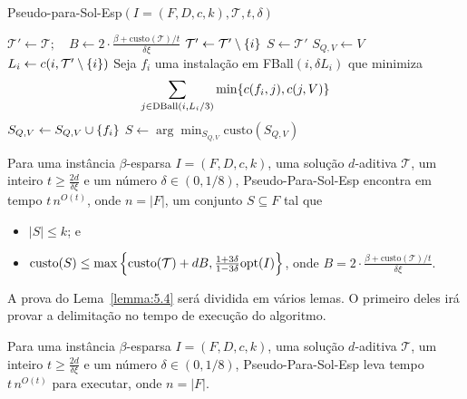 \begin{algorithm}
    \caption{\sc Pseudo-para-Sol-Esp$(I = (F,D,c,k), \mathcal{T}, t, \delta)$}
    \begin{algorithmic}[1]
        \State $\mathcal{T}' \gets \mathcal{T}; \quad B \gets 2 \cdot \frac{\beta + \text{custo}(\mathcal{T})/t}{\delta\xi}$
        \State $\mathcal{T}' \gets \mathcal{T}' \setminus \{i\}$
        \EndWhile
        \State \Return $S \gets \mathcal{T}'$
        \EndIf
            \State $S_{Q,V} \gets V$
                \State $L_i \gets c(i,\mathcal{T}' \setminus \{i\})$
                \State Seja $f_i$ uma instalação em FBall$(i, \delta L_i)$ que minimiza \[\sum_{j \in \text{DBall}(i,L_i/3)} \min\{c(f_i,j),c(j,V)\}\]
                \State $S_{Q,V} \gets S_{Q,V} \cup \{f_i\}$
            \EndFor
        \EndFor
        \State \Return $S \gets \arg\min_{S_{Q,V}} \text{custo}(S_{Q,V})$
    \end{algorithmic}
\end{algorithm}

\begin{lemma} \label{lemma:5.4}
    Para uma instância $\beta$-esparsa $I = (F,D,c,k)$, uma solução $d$-aditiva $\mathcal{T}$, um inteiro $t \geq \frac{2d}{\delta \xi}$ e um número $\delta \in (0,1/8)$, {\sc Pseudo-Para-Sol-Esp} encontra em tempo $t\, n^{O(t)}$, onde $n = |F|$, um conjunto $S \subseteq F$ tal que 
    \begin{itemize}
        \item $|S| \leq k$; e
        \item $\mathrm{custo}(S) \leq \max \left\{ \mathrm{custo}(\mathcal{T}) + dB, \frac{1+3\delta}{1-3\delta} \mathrm{opt}(I)\right\}$, onde $B = 2 \cdot \frac{\beta + \mathrm{custo}(\mathcal{T})/t}{\delta\xi}$.
    \end{itemize}
\end{lemma}

A prova do Lema~\ref{lemma:5.4} será dividida em vários lemas. O primeiro deles irá provar a delimitação no tempo de execução do algoritmo.

\begin{lemma}
    Para uma instância $\beta$-esparsa $I = (F,D,c,k)$, uma solução $d$-aditiva $\mathcal{T}$, um inteiro $t \geq \frac{2d}{\delta \xi}$ e um número $\delta \in (0,1/8)$, {\sc Pseudo-Para-Sol-Esp} leva tempo $t\, n^{O(t)}$ para executar, onde $n = |F|$.
\end{lemma}

